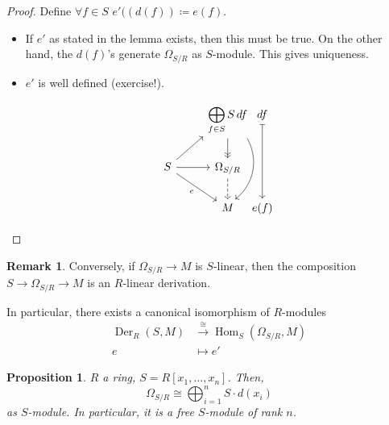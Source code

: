 \documentclass[12pt]{article}
\DeclareMathOperator{\Hom}{Hom}
\DeclareMathOperator{\Der}{Der}
\newtheorem*{proposition}{Proposition}
\theoremstyle{definition}
\newtheorem*{remark}{Remark}
\begin{document}
\begin{proof}
Define $\forall f\in S$ $e'((d(f))\coloneqq e(f)$.

\begin{itemize}[label=$-$]
\item If $e'$ as stated in the lemma exists, then this must be true. On the other hand, the $d(f)$'s generate $\Omega_{S/R}$ as $S$-module. This gives uniqueness.

\item $e'$ is well defined (exercise!).

\[
\begin{tikzcd}
&\displaystyle{\bigoplus_{f\in S}S\,df}\arrow[->>,d]\arrow[dd,bend left=40,looseness=1]&[-1cm]df\arrow[|->,dd]\\
S\arrow[ru]\arrow[r]\arrow[rd,"e",swap]&\Omega_{S/R}\arrow[d,dashed]\\
&M&e(f)
\end{tikzcd}
\]
\end{itemize}
\end{proof}

\begin{remark}
Conversely, if $\Omega_{S/R}\rightarrow M$ is $S$-linear, then the composition $S\rightarrow\Omega_{S/R}\rightarrow M$ is an $R$-linear derivation.

In particular, there exists a canonical isomorphism of $R$-modules
\begin{align*}
\Der_R(S,M)&\overset{\cong}{\longrightarrow}\Hom_S(\Omega_{S/R},M)\\
e&\longmapsto e'
\end{align*}
\end{remark}

\begin{proposition}
$R$ a ring, $S=R[x_1,\ldots,x_n]$. Then,
\[\Omega_{S/R}\cong\bigoplus_{i=1}^nS\cdot d(x_i)\]
as $S$-module. In particular, it is a free $S$-module of rank $n$.
\end{proposition}
\end{document}
